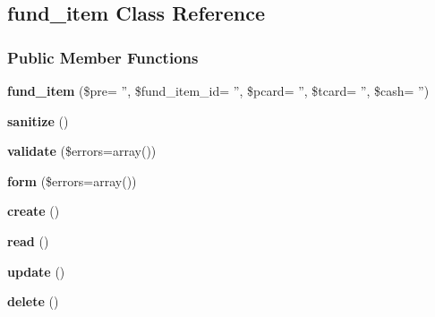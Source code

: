 \hypertarget{classfund__item}{\subsection{fund\-\_\-item Class Reference}
\label{classfund__item}
}
\subsubsection*{Public Member Functions}
\begin{DoxyCompactItemize}
\item 
\hypertarget{classfund__item_af69090971e06f95d3111bc3929bbc7ed}{{\bfseries fund\-\_\-item} (\$pre= '', \$fund\-\_\-item\-\_\-id= '', \$pcard= '', \$tcard= '', \$cash= '')}\label{classfund__item_af69090971e06f95d3111bc3929bbc7ed}

\item 
\hypertarget{classfund__item_aa8628904b128c99427ffa76221c25dfe}{{\bfseries sanitize} ()}\label{classfund__item_aa8628904b128c99427ffa76221c25dfe}

\item 
\hypertarget{classfund__item_a2109568c112c06633edc9c37b5d86df1}{{\bfseries validate} (\$errors=array())}\label{classfund__item_a2109568c112c06633edc9c37b5d86df1}

\item 
\hypertarget{classfund__item_a4e39a4bb6a2e90742676ed85f962fb41}{{\bfseries form} (\$errors=array())}\label{classfund__item_a4e39a4bb6a2e90742676ed85f962fb41}

\item 
\hypertarget{classfund__item_a724d21d4ff770da7a292acb470889a5d}{{\bfseries create} ()}\label{classfund__item_a724d21d4ff770da7a292acb470889a5d}

\item 
\hypertarget{classfund__item_a1466fe9e207fbd60997abc95b166c029}{{\bfseries read} ()}\label{classfund__item_a1466fe9e207fbd60997abc95b166c029}

\item 
\hypertarget{classfund__item_a57e77343b1a2fe03ae2407372cf00a2b}{{\bfseries update} ()}\label{classfund__item_a57e77343b1a2fe03ae2407372cf00a2b}

\item 
\hypertarget{classfund__item_a25a1cda3c7b7ab89f212b9b07bec25b8}{{\bfseries delete} ()}\label{classfund__item_a25a1cda3c7b7ab89f212b9b07bec25b8}

\end{DoxyCompactItemize}
